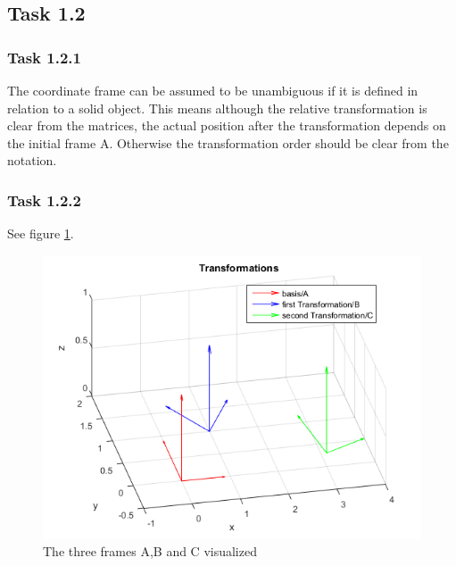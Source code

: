 \subsection*{Task 1.2}
\subsubsection*{Task 1.2.1}
The coordinate frame can be assumed to be unambiguous if it is defined in relation to a solid object. This means although the relative transformation is clear from the matrices, the actual position after the transformation depends on the initial frame A. Otherwise the transformation order should be clear from the notation. 
\subsubsection*{Task 1.2.2}
See figure \ref{fig:task_1_2_2}.
\begin{figure}[H]
	\centering
	\includegraphics[width= \textwidth ]{CoordSys_2.png}
	\caption{The three frames A,B and C visualized}
	\label{fig:task_1_2_2}
\end{figure}